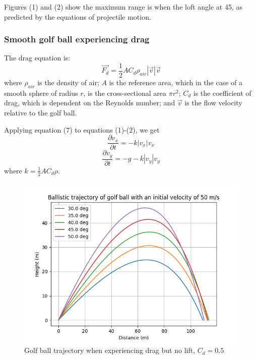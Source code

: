 \documentclass[12pt]{article}
\begin{document}
Figures (1) and (2) show the maximum range is when the loft angle at 45\degree, as predicted by the equations of projectile motion.
\pagebreak
\subsubsection{Smooth golf ball experiencing drag}
The drag equation is:
\begin{equation}
\vec{F_d} = \frac{1}{2} A C_d \rho_{air} |\vec{v}| \vec{v}
\end{equation}
where $\rho_{air}$ is the density of air; $A$ is the reference area, which in the case of a smooth sphere of radius $r$, is the cross-sectional area $\pi r^2$; $C_d$ is the coefficient of drag, which is dependent on the Reynolds number; and $\vec{v}$ is the flow velocity relative to the golf ball.

Applying equation (7) to equations (1)-(2), we get
\begin{equation}
\frac{\partial v_x}{\partial t}=-k |v_x| v_x
\end{equation}
\begin{equation}
\frac{\partial v_y}{\partial t}=-g-k |v_y| v_y
\end{equation}
where $k=\frac{1}{2} A C_d \rho$.
\begin{figure}[H]
\centering
\caption{Golf ball trajectory when experiencing drag but no lift, $C_d=0.5$}
\includegraphics[scale=0.85]{dragapprox}
\end{figure}
\end{document}
